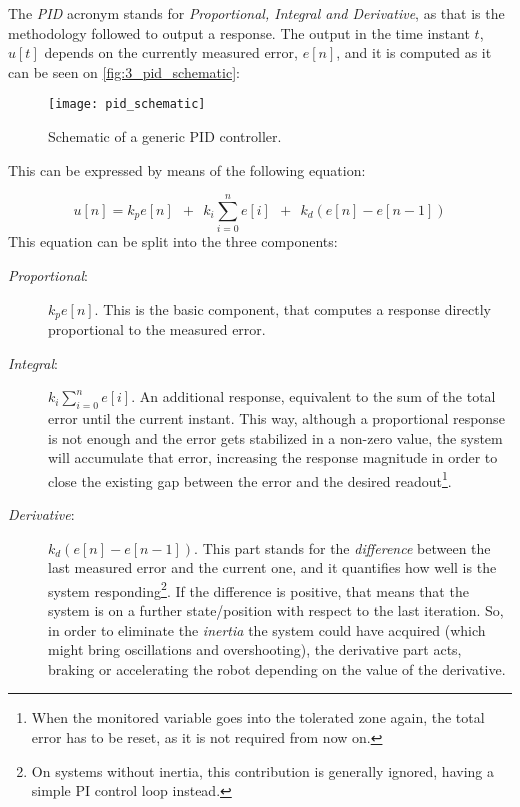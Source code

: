 The \textit{PID} acronym stands for \textit{Proportional, Integral and Derivative}, as that is the methodology followed to output a response. The output in the time instant $t$, $u[t]$ depends on the currently measured error, $e[n]$, and it is computed as it can be seen on \autoref{fig:3_pid_schematic}: 

\begin{figure}
	\centering
	\texttt{[image: pid\_schematic]}
	\caption{Schematic of a generic PID controller.}
	\label{fig:3_pid_schematic}
\end{figure}

This can be expressed by means of the following equation:

\begin{equation}
u[n] = k_p e[n] \ \ + \ \ k_i \sum_{i=0}^{n}e[i] \ \ + \ \ k_d (e[n] - e[n-1])
\label{eq:3_pid}
\end{equation}
This equation can be split into the three components:
\begin{description}
	\item[\textit{Proportional}:] $k_p e[n]$. This is the basic component, that computes a response directly proportional to the measured error.
	\item[\textit{Integral}:] $k_i \sum_{i=0}^{n}e[i]$. An additional response, equivalent to the sum of the total error until the current instant. This way, although a proportional response is not enough and the error gets stabilized in a non-zero value, the system will accumulate that error, increasing the response magnitude in order to close the existing gap between the error and the desired readout\footnote{When the monitored variable goes into the tolerated zone again, the total error has to be reset, as it is not required from now on.}.
	\item[\textit{Derivative}:] $k_d (e[n] - e[n-1])$. This part stands for the \emph{difference} between the last measured error and the current one, and it quantifies how well is the system responding\footnote{On systems without inertia, this contribution is generally ignored, having a simple PI control loop instead.}. If the difference is positive, that means that the system is on a further state/position with respect to the last iteration. So, in order to eliminate the \emph{inertia} the system could have acquired (which might bring oscillations and overshooting), the derivative part acts, braking or accelerating the robot depending on the value of the derivative.
\end{description}




